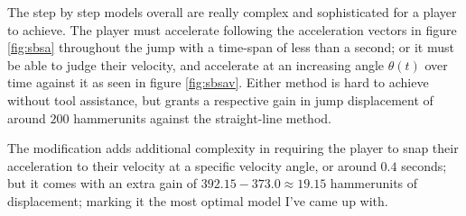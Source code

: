 The step by step models overall are really complex and sophisticated for a player to achieve. The player must accelerate
following the acceleration vectors in figure \ref{fig:sbsa} throughout the jump with a time-span of less than a second; or it must be able to judge their velocity, and accelerate at an increasing angle $\theta(t)$ over time against it as seen in figure \ref{fig:sbsav}. Either method is hard to achieve without tool assistance, but grants a respective gain in jump displacement of around $200$ hammerunits against the straight-line method.

The modification adds additional complexity in requiring the player to snap their acceleration to their velocity at a specific velocity angle, or around $0.4$ seconds; but it comes with an extra gain of $392.15-373.0\approx19.15$ hammerunits of displacement; marking it the most optimal model I've came up with.


